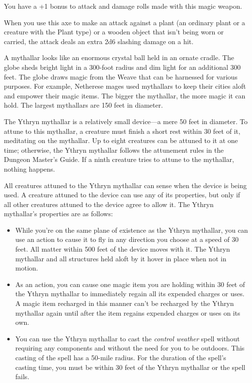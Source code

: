 \documentclass[10pt,a4paper,twoside,bg=print,twocolumn,openany,nodeprecatedcode]{dndbook}
\begin{document}
You have a +1 bonus to attack and damage rolls made with this magic weapon.

When you use this axe to make an attack against a plant (an ordinary plant or a creature with the Plant type) or a wooden object that isn't being worn or carried, the attack deals an extra 2d6 slashing damage on a hit.

A mythallar looks like an enormous crystal ball held in an ornate cradle. The globe sheds bright light in a 300-foot radius and dim light for an additional 300 feet. The globe draws magic from the Weave that can be harnessed for various purposes. For example, Netherese mages used mythallars to keep their cities aloft and empower their magic items. The bigger the mythallar, the more magic it can hold. The largest mythallars are 150 feet in diameter.

The Ythryn mythallar is a relatively small device—a mere 50 feet in diameter. To attune to this mythallar, a creature must finish a short rest within 30 feet of it, meditating on the mythallar. Up to eight creatures can be attuned to it at one time; otherwise, the Ythryn mythallar follows the attunement rules in the Dungeon Master's Guide. If a ninth creature tries to attune to the mythallar, nothing happens.

All creatures attuned to the Ythryn mythallar can sense when the device is being used. A creature attuned to the device can use any of its properties, but only if all other creatures attuned to the device agree to allow it. The Ythryn mythallar's properties are as follows:


\begin{itemize}
\item While you're on the same plane of existence as the Ythryn mythallar, you can use an action to cause it to fly in any direction you choose at a speed of 30 feet. All matter within 500 feet of the device moves with it. The Ythryn mythallar and all structures held aloft by it hover in place when not in motion.
\item As an action, you can cause one magic item you are holding within 30 feet of the Ythryn mythallar to immediately regain all its expended charges or uses. A magic item recharged in this manner can't be recharged by the Ythryn mythallar again until after the item regains expended charges or uses on its own.
\item You can use the Ythryn mythallar to cast the \textit{control weather} spell without requiring any components and without the need for you to be outdoors. This casting of the spell has a 50-mile radius. For the duration of the spell's casting time, you must be within 30 feet of the Ythryn mythallar or the spell fails.
\end{itemize}
\end{document}
